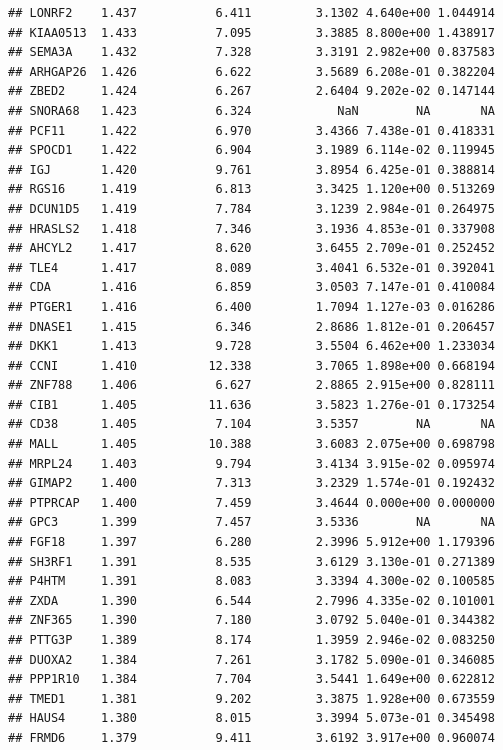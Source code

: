 \documentclass{article}\usepackage[]{graphicx}\usepackage[]{color}
\makeatletter
\newenvironment{kframe}{%
 \def\at@end@of@kframe{}%
 \ifinner\ifhmode%
  \def\at@end@of@kframe{\end{minipage}}%
  \begin{minipage}{\columnwidth}%
 \fi\fi%
 \def\FrameCommand##1{\hskip\@totalleftmargin \hskip-\fboxsep
 \colorbox{shadecolor}{##1}\hskip-\fboxsep
     \hskip-\linewidth \hskip-\@totalleftmargin \hskip\columnwidth}%
 \MakeFramed {\advance\hsize-\width
   \@totalleftmargin\z@ \linewidth\hsize
   \@setminipage}}%
 {\par\unskip\endMakeFramed%
 \at@end@of@kframe}
\newenvironment{knitrout}{}{} %
\makeatother
\begin{document}
\begin{knitrout}
\begin{kframe}
\begin{verbatim}
## LONRF2    1.437           6.411         3.1302 4.640e+00 1.044914
## KIAA0513  1.433           7.095         3.3885 8.800e+00 1.438917
## SEMA3A    1.432           7.328         3.3191 2.982e+00 0.837583
## ARHGAP26  1.426           6.622         3.5689 6.208e-01 0.382204
## ZBED2     1.424           6.267         2.6404 9.202e-02 0.147144
## SNORA68   1.423           6.324            NaN        NA       NA
## PCF11     1.422           6.970         3.4366 7.438e-01 0.418331
## SPOCD1    1.422           6.904         3.1989 6.114e-02 0.119945
## IGJ       1.420           9.761         3.8954 6.425e-01 0.388814
## RGS16     1.419           6.813         3.3425 1.120e+00 0.513269
## DCUN1D5   1.419           7.784         3.1239 2.984e-01 0.264975
## HRASLS2   1.418           7.346         3.1936 4.853e-01 0.337908
## AHCYL2    1.417           8.620         3.6455 2.709e-01 0.252452
## TLE4      1.417           8.089         3.4041 6.532e-01 0.392041
## CDA       1.416           6.859         3.0503 7.147e-01 0.410084
## PTGER1    1.416           6.400         1.7094 1.127e-03 0.016286
## DNASE1    1.415           6.346         2.8686 1.812e-01 0.206457
## DKK1      1.413           9.728         3.5504 6.462e+00 1.233034
## CCNI      1.410          12.338         3.7065 1.898e+00 0.668194
## ZNF788    1.406           6.627         2.8865 2.915e+00 0.828111
## CIB1      1.405          11.636         3.5823 1.276e-01 0.173254
## CD38      1.405           7.104         3.5357        NA       NA
## MALL      1.405          10.388         3.6083 2.075e+00 0.698798
## MRPL24    1.403           9.794         3.4134 3.915e-02 0.095974
## GIMAP2    1.400           7.313         3.2329 1.574e-01 0.192432
## PTPRCAP   1.400           7.459         3.4644 0.000e+00 0.000000
## GPC3      1.399           7.457         3.5336        NA       NA
## FGF18     1.397           6.280         2.3996 5.912e+00 1.179396
## SH3RF1    1.391           8.535         3.6129 3.130e-01 0.271389
## P4HTM     1.391           8.083         3.3394 4.300e-02 0.100585
## ZXDA      1.390           6.544         2.7996 4.335e-02 0.101001
## ZNF365    1.390           7.180         3.0792 5.040e-01 0.344382
## PTTG3P    1.389           8.174         1.3959 2.946e-02 0.083250
## DUOXA2    1.384           7.261         3.1782 5.090e-01 0.346085
## PPP1R10   1.384           7.704         3.5441 1.649e+00 0.622812
## TMED1     1.381           9.202         3.3875 1.928e+00 0.673559
## HAUS4     1.380           8.015         3.3994 5.073e-01 0.345498
## FRMD6     1.379           9.411         3.6192 3.917e+00 0.960074

\end{verbatim}
\end{kframe}
\end{knitrout}
\end{document}
